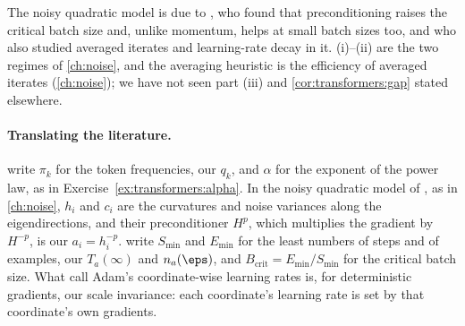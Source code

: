 \begin{refsection}
The noisy quadratic model is due to \textcite{ZhangEtAl2019}, who found that preconditioning raises the critical batch size \parencite{McCandlishEtAl2018} and, unlike momentum, helps at small batch sizes too, and who also studied averaged iterates and learning-rate decay in it. (i)--(ii) are the two regimes of \cref{ch:noise}, and the averaging heuristic is the efficiency of averaged iterates (\cref{ch:noise}); we have not seen part (iii) and \cref{cor:transformers:gap} stated elsewhere.

\paragraph{Translating the literature.} \Textcite{KunstnerBach2025} write $\pi_k$ for the token frequencies, our $q_k$, and $\alpha$ for the exponent of the power law, as in Exercise~\ref{ex:transformers:alpha}. In the noisy quadratic model of \textcite{ZhangEtAl2019}, as in \cref{ch:noise}, $h_i$ and $c_i$ are the curvatures and noise variances along the eigendirections, and their preconditioner $H^p$, which multiplies the gradient by $H^{-p}$, is our $a_i=h_i^{-p}$. \Textcite{McCandlishEtAl2018} write $S_{\min}$ and $E_{\min}$ for the least numbers of steps and of examples, our $T_a(\infty)$ and $n_a(\eps)$, and $B_{\mathrm{crit}}=E_{\min}/S_{\min}$ for the critical batch size. What \textcite{ZhangEtAl2024} call Adam's coordinate-wise learning rates is, for deterministic gradients, our scale invariance: each coordinate's learning rate is set by that coordinate's own gradients.

\printchapterbib
\end{refsection}
